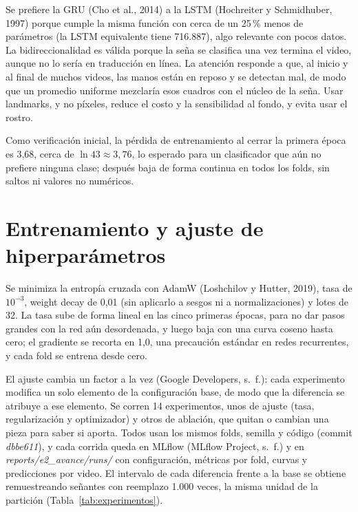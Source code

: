 \documentclass[11pt,a4paper]{article}
\newcommand{\code}[1]{\textit{#1}}
\begin{document}
Se prefiere la GRU (Cho et al., 2014) a la LSTM (Hochreiter y Schmidhuber, 1997) porque cumple la misma función con cerca de un 25\,\% menos de parámetros (la LSTM equivalente tiene 716.887), algo relevante con pocos datos. La bidireccionalidad es válida porque la seña se clasifica una vez termina el video, aunque no lo sería en traducción en línea. La atención responde a que, al inicio y al final de muchos videos, las manos están en reposo y se detectan mal, de modo que un promedio uniforme mezclaría esos cuadros con el núcleo de la seña. Usar landmarks, y no píxeles, reduce el costo y la sensibilidad al fondo, y evita usar el rostro.

Como verificación inicial, la pérdida de entrenamiento al cerrar la primera época es 3,68, cerca de $\ln 43 \approx 3{,}76$, lo esperado para un clasificador que aún no prefiere ninguna clase; después baja de forma continua en todos los folds, sin saltos ni valores no numéricos.

\section{Entrenamiento y ajuste de hiperparámetros}

Se minimiza la entropía cruzada con AdamW (Loshchilov y Hutter, 2019), tasa de $10^{-3}$, weight decay de 0,01 (sin aplicarlo a sesgos ni a normalizaciones) y lotes de 32. La tasa sube de forma lineal en las cinco primeras épocas, para no dar pasos grandes con la red aún desordenada, y luego baja con una curva coseno hasta cero; el gradiente se recorta en 1,0, una precaución estándar en redes recurrentes, y cada fold se entrena desde cero.

El ajuste cambia un factor a la vez (Google Developers, s.~f.): cada experimento modifica un solo elemento de la configuración base, de modo que la diferencia se atribuye a ese elemento. Se corren 14 experimentos, unos de ajuste (tasa, regularización y optimizador) y otros de ablación, que quitan o cambian una pieza para saber si aporta. Todos usan los mismos folds, semilla y código (commit \code{dbbe611}), y cada corrida queda en MLflow (MLflow Project, s.~f.) y en \code{reports/e2\_avance/runs/} con configuración, métricas por fold, curvas y predicciones por video. El intervalo de cada diferencia frente a la base se obtiene remuestreando señantes con reemplazo 1.000 veces, la misma unidad de la partición (Tabla~\ref{tab:experimentos}).
\end{document}

